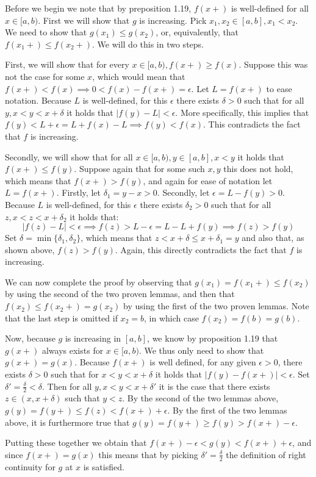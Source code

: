 \begin{solution}

    Before we begin we note that by preposition 1.19, $f(x+)$ is well-defined for all $x \in [a, b)$. 
    First we will show that $g$ is increasing. 
    Pick $x_1, x_2 \in [a, b], x_1 < x_2$. 
    We need to show that $g(x_1) \leq g(x_2)$, or, equivalently, that $f(x_1+) \leq f(x_2+)$.
    We will do this in two steps. 
    
    First, we will show that for every $x \in [a, b), f(x+) \geq f(x)$.
    Suppose this was not the case for some $x$, which would mean that $f(x+) < f(x) \implies 0 < f(x) - f(x+) = \epsilon$. 
    Let $L = f(x+)$ to ease notation. 
    Because $L$ is well-defined, for this $\epsilon$ there exists $\delta > 0$ such that for all $y, x < y < x + \delta$ it holds that $\lvert f(y) - L \rvert < \epsilon$.
    More specifically, this implies that $f(y) < L + \epsilon = L + f(x) - L \implies f(y) < f(x)$.
    This contradicts the fact that $f$ is increasing.

    Secondly, we will show that for all $x \in [a, b), y \in [a, b], x < y$ it holds that $f(x+) \leq f(y)$. 
    Suppose again that for some such $x, y$ this does not hold, which means that $f(x+) > f(y)$, and again for ease of notation let $L = f(x+)$.
    Firstly, let $\delta_1 = y - x > 0$. 
    Secondly, let $\epsilon = L - f(y) > 0$.
    Because $L$ is well-defined, for this $\epsilon$ there exists $\delta_2 > 0$ such that for all $z, x < z < x + \delta_2$ it holds that:
    $$\lvert f(z) - L \rvert < \epsilon \implies f(z) > L - \epsilon = L - L + f(y) \implies f(z) > f(y)$$
    Set $\delta = \min\{\delta_1, \delta_2\}$, which means that $z < x + \delta \leq x + \delta_1 = y$ and also that, as shown above, $f(z) > f(y)$.
    Again, this directly contradicts the fact that $f$ is increasing.

    We can now complete the proof by observing that $g(x_1) = f(x_1+) \leq f(x_2)$ by using the second of the two proven lemmas, and then that $f(x_2) \leq f(x_2+) = g(x_2)$ by using the first of the two proven lemmas. 
    Note that the last step is omitted if $x_2 = b$, in which case $f(x_2) = f(b) = g(b)$.

    Now, because $g$ is increasing in $[a, b]$, we know by proposition 1.19 that $g(x+)$ always exists for $x \in [a, b)$.
    We thus only need to show that $g(x+) = g(x)$. 
    Because $f(x+)$ is well defined, for any given $\epsilon > 0$, there exists $\delta > 0$ such that for $x < y < x + \delta$ it holds that $\lvert f(y) - f(x+) \rvert < \epsilon$. 
    Set $\delta' = \frac{\delta}{2} < \delta$. Then for all $y, x < y < x + \delta'$ it is the case that there exists $z \in (x, x + \delta)$ such that $y < z$.
    By the second of the two lemmas above, $g(y) = f(y+) \leq f(z) < f(x+) + \epsilon$.
    By the first of the two lemmas above, it is furthermore true that $g(y) = f(y+) \geq f(y) > f(x+) - \epsilon$.

    Putting these together we obtain that $f(x+) - \epsilon < g(y) < f(x+) + \epsilon$, and since $f(x+) = g(x)$ this means that by picking $\delta' = \frac{\delta}{2}$ the definition of right continuity for $g$ at $x$ is satisfied.
\end{solution}